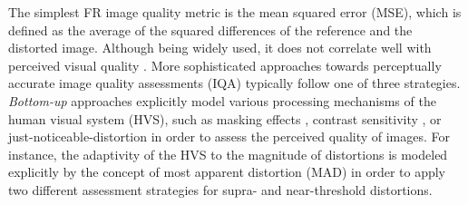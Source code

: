 \documentclass[11pt,a4paper]{article}
\begin{document}
The simplest FR image quality metric is the mean
squared error (MSE), which is defined as the average of the squared differences of the reference and the distorted image. Although being widely used, it
does not correlate well with perceived visual quality \cite{Gir93}.
More sophisticated approaches towards perceptually accurate image quality
assessments (IQA) typically follow one of three strategies. \textit{Bottom-up}
approaches explicitly model various processing mechanisms of the human visual
system (HVS), such as masking effects \cite{Watsona1997}, contrast sensitivity
\cite{daly1990}, or just-noticeable-distortion \cite{Lubin1997,
jia2006estimating} in order to assess the perceived quality of images. For
instance, the adaptivity of the HVS to the magnitude of distortions is modeled
explicitly by the concept of most apparent distortion (MAD) \cite{LaCh2010} in order to apply
two different assessment strategies for supra- and near-threshold distortions.      
 
\end{document}
